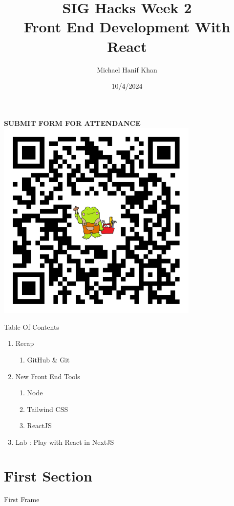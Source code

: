 \documentclass{beamer}
\title{SIG Hacks Week 2 \\
Front End Development With React}
\date{10/4/2024}
\author{Michael Hanif Khan}
\institute{The Association for Computing Machinery @ UIC}
\begin{document}
 	\maketitle

	\begin{frame}
		\begin{center}
		\textbf{SUBMIT FORM FOR ATTENDANCE} \\
		\includegraphics[width=0.75\textwidth]{qr.png}
		\end{center}
	\end{frame}
	\begin{frame}{Table Of Contents}
		\begin{enumerate}
			\item Recap
			\begin{enumerate}
				\item GitHub \& Git
			\end{enumerate}
			\item New Front End Tools
			\begin{enumerate}
				\item Node
				\item Tailwind CSS
				\item ReactJS
			\end{enumerate}
			\item Lab : Play with React in NextJS
		\end{enumerate}
	\end{frame}
	\section{First Section}
	\begin{frame}{First Frame}
	\end{frame}
\end{document}

